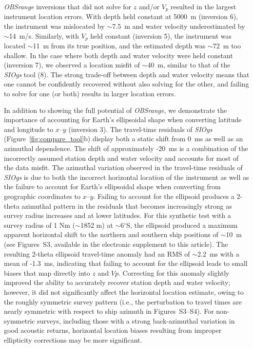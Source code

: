 \textit{OBSrange} inversions that did not solve for $z$ and/or $V_p$ resulted in the largest instrument location errors. With depth held constant at 5000~m (inversion 6), the instrument was mislocated by $\sim$7.5~m and water velocity underestimated by $\sim$14~m/s. Similarly, with $V_p$ held constant (inversion 5), the instrument was located $\sim$11~m from its true position, and the estimated depth was $\sim$72~m too shallow. In the case where both depth and water velocity were held constant (inversion 7), we observed a location misfit of $\sim$40~m, similar to that of the \textit{SIOgs} tool (8). The strong trade-off between depth and water velocity means that one cannot be confidently recovered without also solving for the other, and failing to solve for one (or both) results in larger location errors.

In addition to showing the full potential of \textit{OBSrange}, we demonstrate the importance of accounting for Earth's ellipsoidal shape when converting latitude and longitude to $x$--$y$ (inversion 3). The travel-time residuals of \textit{SIOgs} (Figure~\ref{fig:compare_tool}b) display both a static shift from 0~ms as well as an azimuthal dependence. The shift of approximately -20~ms is a combination of the incorrectly assumed station depth and water velocity and accounts for most of the data misfit. The azimuthal variation observed in the travel-time residuals of \textit{SIOgs} is due to both the incorrect horizontal location of the instrument as well as the failure to account for Earth's ellipsoidal shape when converting from geographic coordinates to $x$--$y$. Failing to account for the ellipsoid produces a 2-theta azimuthal pattern in the residuals that becomes increasingly strong as survey radius increases and at lower latitudes. For this synthetic test with a survey radius of 1 Nm ($\sim$1852 m) at $\sim$6$^{\circ}$S, the ellipsoid produced a maximum apparent horizontal shift to the northern and southern ship positions of $\sim$10~m (see Figures~S3, available in the electronic supplement to this article). The resulting 2-theta ellipsoid travel-time anomaly had an RMS of $\sim$2.2~ms with a mean of -1.3~ms, indicating that failing to account for the ellipsoid leads to small biases that map directly into $z$ and $Vp$. Correcting for this anomaly slightly improved the ability to accurately recover station depth and water velocity; however, it did not significantly affect the horizontal location estimate, owing to the roughly symmetric survey pattern (i.e., the perturbation to travel times are nearly symmetric with respect to ship azimuth in Figures~S3--S4). For non-symmetric surveys, including those with a strong back-azimuthal variation in good acoustic returns, horizontal location biases resulting from improper ellipticity corrections may be more significant.

